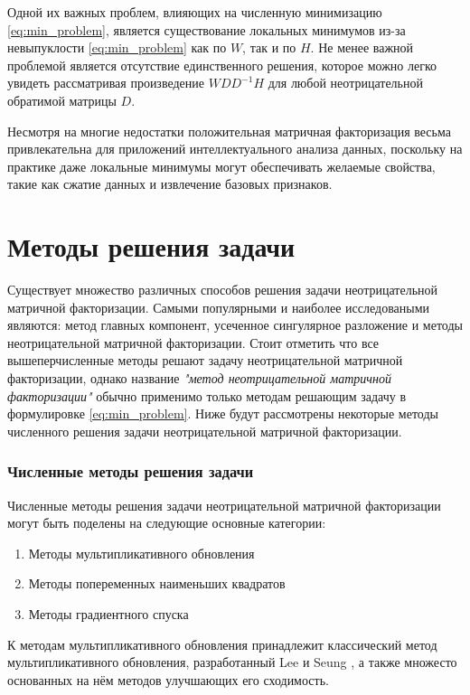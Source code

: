 Одной их важных проблем, влияющих на численную минимизацию \ref{eq:min_problem},
является существование локальных минимумов
из-за невыпуклости \ref{eq:min_problem} как по $W$, так и по $H$.
Не менее важной проблемой является отсутствие единственного решения,
которое можно легко увидеть рассматривая произведение $WDD^{− 1}H$ для любой неотрицательной обратимой матрицы $D$.

Несмотря на многие недостатки положительная матричная факторизация весьма привлекательна для приложений интеллектуального анализа данных,
поскольку на практике даже локальные минимумы могут обеспечивать желаемые свойства, такие как сжатие данных и извлечение базовых признаков.





\newpage





\section{Методы решения задачи}

Существует множество различных способов решения задачи неотрицательной матричной факторизации.
Самыми популярными и наиболее исследоваными являются: метод главных компонент, усеченное сингулярное разложение и методы неотрицательной матричной факторизации.
Стоит отметить что все вышеперчисленные методы решают задачу неотрицательной матричной факторизации,
однако название \textit{"метод неотрицательной матричной факторизации"} обычно применимо только методам решающим задачу в формулировке \ref{eq:min_problem}.
Ниже будут рассмотрены некоторые методы численного решения задачи неотрицательной матричной факторизации.

\subsubsection{Численные методы решения задачи}
Численные методы решения задачи неотрицательной матричной факторизации
могут быть поделены на следующие основные категории:
\begin{enumerate}
	\item Методы мультипликативного обновления
	\item Методы попеременных наименьших квадратов
	\item Методы градиентного спуска
\end{enumerate}

К методам мультипликативного обновления принадлежит классический метод мультипликативного обновления,
разработанный Lee и Seung \cite{lee_seung},
а также множесто основанных на нём методов улучшающих его сходимость.

